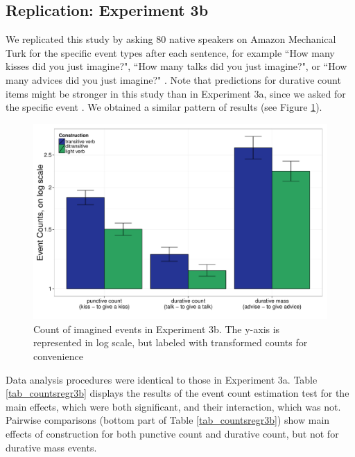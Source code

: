 \documentclass[preprint,12pt,authoryear]{elsarticle}
\begin{document}
\subsection{Replication: Experiment 3b}\label{repl_HowMany}
We replicated this study by asking 80 native speakers on Amazon Mechanical Turk for the  specific event types  after each sentence, for example ``How many kisses did you just imagine?", ``How many talks did you just imagine?", or ``How many advices did you just imagine?" . Note that predictions for durative count items might be stronger in this study than in Experiment 3a, since we asked for the specific event . We obtained a similar pattern of results (see Figure \ref{fig_resCount3b}).

\begin{figure}
\centering
\includegraphics[width=1\textwidth]{./Figures/Exp3b_EventCountsBar.pdf}
\caption{Count of imagined events in Experiment 3b. The y-axis is represented in log scale, but labeled with transformed counts  for convenience }
\label{fig_resCount3b}
\end{figure}

Data analysis procedures were identical to those in Experiment 3a. Table \ref{tab_countsregr3b} displays the results of the event count estimation test for the main effects, which were both significant, and their interaction, which was not. Pairwise comparisons (bottom part of Table \ref{tab_countsregr3b}) show main effects of construction for both punctive count and durative count, but not for durative mass events. 
\end{document}
